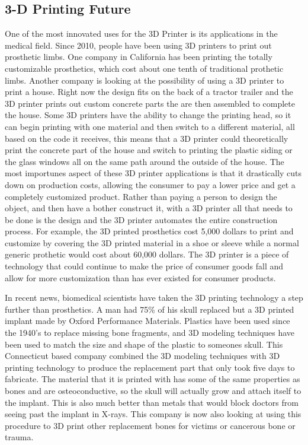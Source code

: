 \documentclass[pdftex,10.5pt]{report}
\begin{document}
\subsection{3-D Printing Future}
One of the most innovated uses for the 3D Printer is its applications in the medical field. Since 2010, people have been using 3D printers to print out prosthetic limbs. One company in California has been printing the totally customizable prosthetics, which cost about one tenth of traditional prothetic limbs. Another company is looking at the possibility of using a 3D printer to print a house. Right now the design fits on the back of a tractor trailer and the 3D printer prints out custom concrete parts the are then assembled to complete the house. Some 3D printers have the ability to change the printing head, so it can begin printing with one material and then switch to a different material, all based on the code it receives, this means that a 3D printer could theoretically print the concrete part of the house and switch to printing the plastic siding or the glass windows all on the same path around the outside of the house. The most importunes aspect of these 3D printer applications is that it drastically cuts down on production costs, allowing the consumer to pay a lower price and get a completely customized product. Rather than paying a person to design the object, and then have a bother construct it, with a 3D printer all that needs to be done is the design and the 3D printer automates the entire construction process. For example, the 3D printed prosthetics cost 5,000 dollars to print and customize by covering the 3D printed material in a shoe or sleeve while a normal generic prothetic would cost about 60,000 dollars.\cite{cite5} The 3D printer is a piece of technology that could continue to make the price of consumer goods fall and allow for more customization than has ever existed for consumer products.

In recent news, biomedical scientists have taken the 3D printing technology a step further than prosthetics. A man had 75\% of his skull replaced but a 3D printed implant made by Oxford Performance Materials. Plastics have been used since the 1940's to replace missing bone fragments, and 3D modeling techniques have been used to match the size and shape of the plastic to someones skull. This Connecticut based company combined the 3D modeling techniques with 3D printing technology to produce the replacement part that only took five days to fabricate.\cite{cite9} The material that it is printed with has some of the same properties as bones and are osteoconductive, so the skull will actually grow and attach itself to the implant. This is also much better than metals that would block doctors from seeing past the implant in X-rays. This company is now also looking at using this procedure to 3D print other replacement bones for victims or cancerous bone or trauma.
\end{document}
